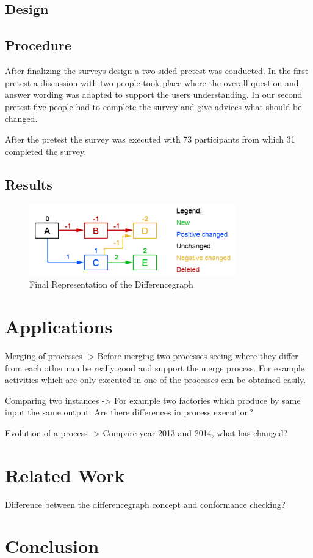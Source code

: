 \documentclass{llncs}
\begin{document}
\subsection{Design}
\label{sec:Design}

\subsection{Procedure}
\label{sec:Procedure}
After finalizing the surveys design a two-sided pretest was conducted. In the first pretest a discussion with two people took place where the overall question and answer wording was adapted to support the users understanding. In our second pretest five people had to complete the survey and give advices what should be changed. 

After the pretest the survey was executed with 73 participants from which 31 completed the survey.

\subsection{Results}
\label{sec:Results}



\begin{figure}
	\centering
	\includegraphics[width=0.8\textwidth]{Images/ColorCodedGraph.PNG}
	\caption{Final Representation of the Differencegraph}
	\label{fig:DiffGraphVisualization}
\end{figure}

\section{Applications}
\label{sec:Applications}

Merging of processes -> Before merging two processes seeing where they differ from each other can be really good and support the merge process. For example activities which are only executed in one of the processes can be obtained easily.

Comparing two instances -> For example two factories which produce by same input the same output. Are there differences in process execution?

Evolution of a process -> Compare year 2013 and 2014, what has changed?


\section{Related Work}
\label{sec:RelatedWork}

Difference between the differencegraph concept and conformance checking?

\section{Conclusion}
\label{sec:Conclusion}




\end{document}
